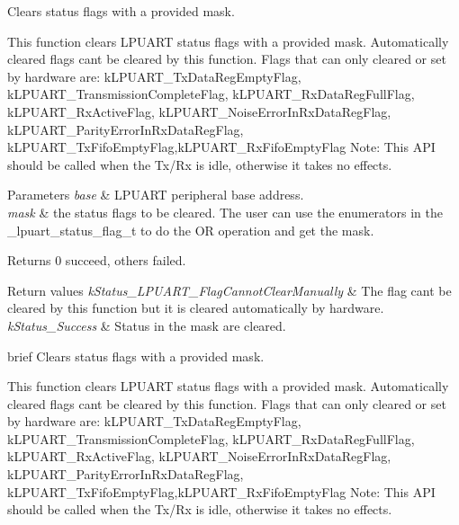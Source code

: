 Clears status flags with a provided mask. 

This function clears L\+P\+U\+A\+RT status flags with a provided mask. Automatically cleared flags can\textquotesingle{}t be cleared by this function. Flags that can only cleared or set by hardware are\+: k\+L\+P\+U\+A\+R\+T\+\_\+\+Tx\+Data\+Reg\+Empty\+Flag, k\+L\+P\+U\+A\+R\+T\+\_\+\+Transmission\+Complete\+Flag, k\+L\+P\+U\+A\+R\+T\+\_\+\+Rx\+Data\+Reg\+Full\+Flag, k\+L\+P\+U\+A\+R\+T\+\_\+\+Rx\+Active\+Flag, k\+L\+P\+U\+A\+R\+T\+\_\+\+Noise\+Error\+In\+Rx\+Data\+Reg\+Flag, k\+L\+P\+U\+A\+R\+T\+\_\+\+Parity\+Error\+In\+Rx\+Data\+Reg\+Flag, k\+L\+P\+U\+A\+R\+T\+\_\+\+Tx\+Fifo\+Empty\+Flag,k\+L\+P\+U\+A\+R\+T\+\_\+\+Rx\+Fifo\+Empty\+Flag Note\+: This A\+PI should be called when the Tx/\+Rx is idle, otherwise it takes no effects.


\begin{DoxyParams}{Parameters}
{\em base} & L\+P\+U\+A\+RT peripheral base address. \\
\hline
{\em mask} & the status flags to be cleared. The user can use the enumerators in the \+\_\+lpuart\+\_\+status\+\_\+flag\+\_\+t to do the OR operation and get the mask. \\
\hline
\end{DoxyParams}
\begin{DoxyReturn}{Returns}
0 succeed, others failed. 
\end{DoxyReturn}

\begin{DoxyRetVals}{Return values}
{\em k\+Status\+\_\+\+L\+P\+U\+A\+R\+T\+\_\+\+Flag\+Cannot\+Clear\+Manually} & The flag can\textquotesingle{}t be cleared by this function but it is cleared automatically by hardware. \\
\hline
{\em k\+Status\+\_\+\+Success} & Status in the mask are cleared.\\
\hline
\end{DoxyRetVals}
brief Clears status flags with a provided mask.

This function clears L\+P\+U\+A\+RT status flags with a provided mask. Automatically cleared flags can\textquotesingle{}t be cleared by this function. Flags that can only cleared or set by hardware are\+: k\+L\+P\+U\+A\+R\+T\+\_\+\+Tx\+Data\+Reg\+Empty\+Flag, k\+L\+P\+U\+A\+R\+T\+\_\+\+Transmission\+Complete\+Flag, k\+L\+P\+U\+A\+R\+T\+\_\+\+Rx\+Data\+Reg\+Full\+Flag, k\+L\+P\+U\+A\+R\+T\+\_\+\+Rx\+Active\+Flag, k\+L\+P\+U\+A\+R\+T\+\_\+\+Noise\+Error\+In\+Rx\+Data\+Reg\+Flag, k\+L\+P\+U\+A\+R\+T\+\_\+\+Parity\+Error\+In\+Rx\+Data\+Reg\+Flag, k\+L\+P\+U\+A\+R\+T\+\_\+\+Tx\+Fifo\+Empty\+Flag,k\+L\+P\+U\+A\+R\+T\+\_\+\+Rx\+Fifo\+Empty\+Flag Note\+: This A\+PI should be called when the Tx/\+Rx is idle, otherwise it takes no effects.

